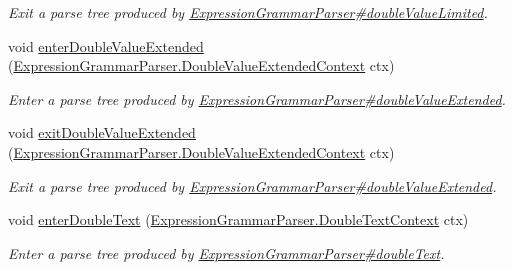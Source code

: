 \begin{DoxyCompactItemize}
\begin{DoxyCompactList}\small\item\em Exit a parse tree produced by \hyperlink{classgov_1_1nasa_1_1jpf_1_1inspector_1_1server_1_1expression_1_1parser_1_1_expression_grammar_parser_a57521cfe69d446d750563c91e30a034c}{Expression\+Grammar\+Parser\#double\+Value\+Limited}. \end{DoxyCompactList}\item 
void \hyperlink{interfacegov_1_1nasa_1_1jpf_1_1inspector_1_1server_1_1expression_1_1parser_1_1_expression_grammar_listener_a967fef80fb95b8e8b3a1d6de859f8457}{enter\+Double\+Value\+Extended} (\hyperlink{classgov_1_1nasa_1_1jpf_1_1inspector_1_1server_1_1expression_1_1parser_1_1_expression_grammar_paf529e59fbe08e921d008fd67634bb19c}{Expression\+Grammar\+Parser.\+Double\+Value\+Extended\+Context} ctx)
\begin{DoxyCompactList}\small\item\em Enter a parse tree produced by \hyperlink{classgov_1_1nasa_1_1jpf_1_1inspector_1_1server_1_1expression_1_1parser_1_1_expression_grammar_parser_ae0693f1cb83f2bfc63b96a0f9debe43f}{Expression\+Grammar\+Parser\#double\+Value\+Extended}. \end{DoxyCompactList}\item 
void \hyperlink{interfacegov_1_1nasa_1_1jpf_1_1inspector_1_1server_1_1expression_1_1parser_1_1_expression_grammar_listener_a81b2ffce39498d829dc4a5309e020801}{exit\+Double\+Value\+Extended} (\hyperlink{classgov_1_1nasa_1_1jpf_1_1inspector_1_1server_1_1expression_1_1parser_1_1_expression_grammar_paf529e59fbe08e921d008fd67634bb19c}{Expression\+Grammar\+Parser.\+Double\+Value\+Extended\+Context} ctx)
\begin{DoxyCompactList}\small\item\em Exit a parse tree produced by \hyperlink{classgov_1_1nasa_1_1jpf_1_1inspector_1_1server_1_1expression_1_1parser_1_1_expression_grammar_parser_ae0693f1cb83f2bfc63b96a0f9debe43f}{Expression\+Grammar\+Parser\#double\+Value\+Extended}. \end{DoxyCompactList}\item 
void \hyperlink{interfacegov_1_1nasa_1_1jpf_1_1inspector_1_1server_1_1expression_1_1parser_1_1_expression_grammar_listener_ace3875feeda89ab3fbc870d0e4870da7}{enter\+Double\+Text} (\hyperlink{classgov_1_1nasa_1_1jpf_1_1inspector_1_1server_1_1expression_1_1parser_1_1_expression_grammar_parser_1_1_double_text_context}{Expression\+Grammar\+Parser.\+Double\+Text\+Context} ctx)
\begin{DoxyCompactList}\small\item\em Enter a parse tree produced by \hyperlink{classgov_1_1nasa_1_1jpf_1_1inspector_1_1server_1_1expression_1_1parser_1_1_expression_grammar_parser_a3795d0b45018e075565149ff89fe27f6}{Expression\+Grammar\+Parser\#double\+Text}. \end{DoxyCompactList}\item 

\end{DoxyCompactItemize}
